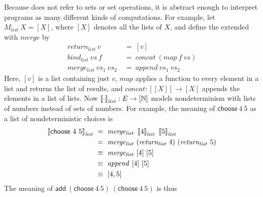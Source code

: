 Because  does not refer to sets or set operations, it is abstract enough to interpret programs as many different kinds of computations.
For example, let $M_\mathit{list}~X = [X]$, where $[X]$ denotes all the lists of $X$, and define the  extended with $\mathit{merge}$ by
\begin{equation}
\begin{aligned}
	\mathit{return_{list}}~v &\ =\ [v]
\\
	\mathit{bind_{list}}~\mathit{vs}~f &\ =\ \mathit{concat}~(\mathit{map}~f~\mathit{vs})
\\
	\mathit{merge_{list}}~\mathit{vs}_1~\mathit{vs}_2 &\ =\ \mathit{append}~\mathit{vs}_1~\mathit{vs}_2
\end{aligned}
\end{equation}
Here, $[v]$ is a list containing just $v$, $\mathit{map}$ applies a function to every element in a list and returns the list of results, and $\mathit{concat} : [[X]] \to [X]$ appends the elements in a list of lists.
Now $\left\llbracket{\cdot}\right\rrbracket_\mathit{list} : E \to [\mathbb{N}]$ models nondeterminism with lists of numbers instead of sets of numbers.
For example, the meaning of $\mathsf{choose}~4~5$ as a list of nondeterministic choices is
\begin{equation}
\begin{aligned}
	\meaningof{\mathsf{choose}~4~5}_\mathit{list}
	&\ =\ \mathit{merge_{list}}~\meaningof{4}_\mathit{list}~\meaningof{5}_\mathit{list}
\\
	&\ =\ \mathit{merge_{list}}~(\mathit{return_{list}}~4)~(\mathit{return_{list}}~5)
\\
	&\ \equiv\ \mathit{merge_{list}}~[4]~[5]
\\
	&\ \equiv\ \mathit{append}~[4]~[5]
\\
	&\ \equiv\ [4,5]
\label{eqn:list-monad-derivation1}
\end{aligned}
\end{equation}
The meaning of $\mathsf{add}~(\mathsf{choose}~4~5)~(\mathsf{choose}~4~5)$ is thus
